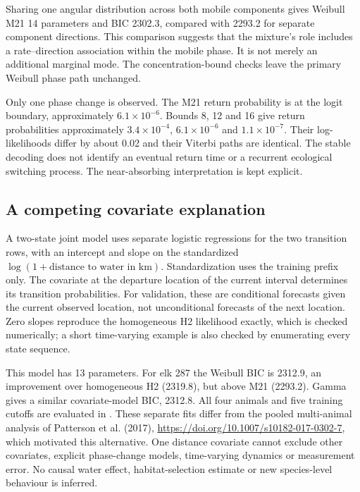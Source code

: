 \documentclass[11pt]{article}
\begin{document}


Sharing one angular distribution across both mobile components gives
Weibull M21 14 parameters and BIC 2302.3, compared with 2293.2 for separate
component directions. This comparison suggests that the mixture's role
includes a rate--direction association within the mobile phase. It is not
merely an additional marginal mode. The concentration-bound checks leave
the primary Weibull phase path unchanged.

Only one phase change is observed. The M21 return probability is at the
logit boundary, approximately $6.1\times10^{-6}$. Bounds 8, 12 and 16
give return probabilities approximately $3.4\times10^{-4}$,
$6.1\times10^{-6}$ and $1.1\times10^{-7}$. Their log-likelihoods differ
by about 0.02 and their Viterbi paths are identical. The stable decoding
does not identify an eventual return time or a recurrent ecological
switching process. The near-absorbing interpretation is kept explicit.

\subsection{A competing covariate explanation}

A two-state joint model uses separate logistic regressions for the two
transition rows, with an intercept and slope on the standardized
$\log(1+\text{distance to water in km})$. Standardization uses the training
prefix only. The covariate at the departure location of the current
interval determines its transition probabilities. For validation, these
are conditional forecasts given the current observed location, not
unconditional forecasts of the next location. Zero slopes reproduce the
homogeneous H2 likelihood exactly, which is checked numerically; a short
time-varying example is also checked by enumerating every state sequence.

This model has 13 parameters. For elk 287 the Weibull BIC is 2312.9, an
improvement over homogeneous H2 (2319.8), but above M21 (2293.2). Gamma
gives a similar covariate-model BIC, 2312.8. All four animals and five
training cutoffs are evaluated in
. These separate
fits differ from the pooled multi-animal analysis of Patterson et al.
(2017), \url{https://doi.org/10.1007/s10182-017-0302-7}, which motivated
this alternative. One distance covariate cannot exclude other covariates,
explicit phase-change models, time-varying dynamics or measurement error.
No causal water effect, habitat-selection estimate or new species-level
behaviour is inferred.
\end{document}
